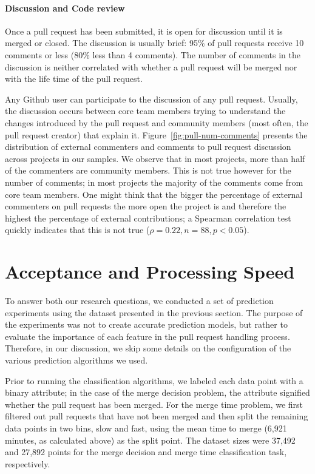 \documentclass{sig-alternate}
\begin{document}
\paragraph*{Discussion and Code review}

Once a pull request has been submitted, it is open for discussion until
it is merged or closed. The discussion is usually brief: 95\% of pull
requests receive 10 comments or less (80\% less than 4 comments). 
The number of comments in the discussion is neither correlated with
whether a pull request will be merged nor with the life time of the
pull request.

Any Github user can participate to the discussion of any pull request.  Usually,
the discussion occurs between core team members trying to understand the changes
introduced by the pull request and community members (most often, the pull
request creator) that explain it.  Figure~\ref{fig:pull-num-comments} presents
the distribution of external commenters and comments to pull request discussion
across projects in our samples. We observe that in most projects, more than half
of the commenters are community members. This is not true however for the number
of comments; in most projects the majority of the comments come from core team
members. One might think that the bigger the percentage of external commenters
on pull requests the more open the project is and therefore the highest the
percentage of external contributions; a Spearman correlation test quickly
indicates that this is not true ($\rho = 0.22, n = 88, p < 0.05$).

\section{Acceptance and Processing Speed}
\label{sec:accrej}

To answer both our research questions, we conducted a set of prediction
experiments using the dataset presented in the previous section.
The purpose of the experiments was not to create accurate prediction
models, but rather to evaluate the importance of each feature
in the pull request handling process. Therefore, in our discussion, 
we skip some details on the configuration of the various
prediction algorithms we used.

Prior to running the classification algorithms, we labeled each data point with
a binary attribute; in the case of the merge decision problem, the attribute
signified whether the pull request has been merged. For the merge time problem,
we first filtered out pull requests that have not been merged and then split
the remaining data points in two bins, slow and fast, using the mean time to
merge (6,921 minutes, as calculated above) as the split point. The dataset
sizes were 37,492 and 27,892 points for the merge decision and merge time
classification task, respectively.
\end{document}
